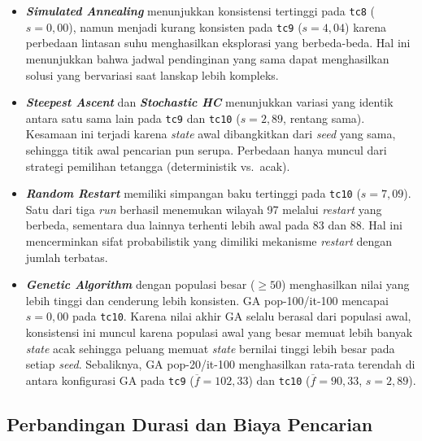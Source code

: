 \begin{itemize}
    \item \textbf{\textit{Simulated Annealing}} menunjukkan konsistensi tertinggi pada \texttt{tc8} ($s = 0{,}00$), namun menjadi kurang konsisten pada \texttt{tc9} ($s = 4{,}04$) karena perbedaan lintasan suhu menghasilkan eksplorasi yang berbeda-beda. Hal ini menunjukkan bahwa jadwal pendinginan yang sama dapat menghasilkan solusi yang bervariasi saat lanskap lebih kompleks.

    \item \textbf{\textit{Steepest Ascent}} dan \textbf{\textit{Stochastic HC}} menunjukkan variasi yang identik antara satu sama lain pada \texttt{tc9} dan \texttt{tc10} ($s = 2{,}89$, rentang sama). Kesamaan ini terjadi karena \textit{state} awal dibangkitkan dari \textit{seed} yang sama, sehingga titik awal pencarian pun serupa. Perbedaan hanya muncul dari strategi pemilihan tetangga (deterministik vs.\ acak).

    \item \textbf{\textit{Random Restart}} memiliki simpangan baku tertinggi pada \texttt{tc10} ($s = 7{,}09$). Satu dari tiga \textit{run} berhasil menemukan wilayah 97 melalui \textit{restart} yang berbeda, sementara dua lainnya terhenti lebih awal pada 83 dan 88. Hal ini mencerminkan sifat probabilistik yang dimiliki mekanisme \textit{restart} dengan jumlah terbatas.

    \item \textbf{\textit{Genetic Algorithm}} dengan populasi besar ($\geq 50$) menghasilkan nilai yang lebih tinggi dan cenderung lebih konsisten. GA pop-100/it-100 mencapai $s = 0{,}00$ pada \texttt{tc10}. Karena nilai akhir GA selalu berasal dari populasi awal, konsistensi ini muncul karena populasi awal yang besar memuat lebih banyak \textit{state} acak sehingga peluang memuat \textit{state} bernilai tinggi lebih besar pada setiap \textit{seed}. Sebaliknya, GA pop-20/it-100 menghasilkan rata-rata terendah di antara konfigurasi GA pada \texttt{tc9} ($\overline{f} = 102{,}33$) dan \texttt{tc10} ($\overline{f} = 90{,}33$, $s = 2{,}89$).
\end{itemize}

\subsection{Perbandingan Durasi dan Biaya Pencarian}

